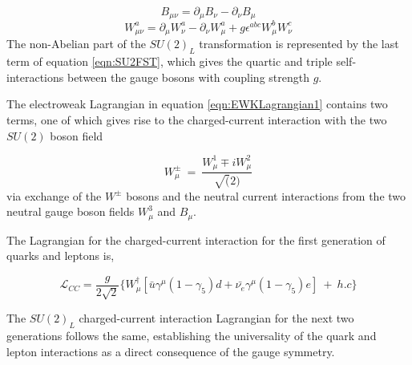 \begin{equation}
B_{\mu\nu} = \partial_{\mu}B_{\nu} - \partial_{\nu}B_{\mu}
\label{eqn:U1YFST}
\end{equation}
\begin{equation}
W_{\mu\nu}^{a} = \partial_{\mu}W_{\nu}^{a} - \partial_{\nu}W_{\mu}^{a} + g\epsilon^{abc}W_{\mu}^{b}W_{\nu}^{c}
\label{eqn:SU2FST}
\end{equation}
The non-Abelian part of the $SU(2)_{L}$ transformation is represented by the last term of equation \ref{eqn:SU2FST}, which gives the quartic and triple self-interactions between the gauge bosons with coupling strength $g$. 

The electroweak Lagrangian in equation \ref{eqn:EWKLagrangian1} contains two terms, one of which gives rise to the charged-current interaction with the two $SU(2)$ boson field 

\begin{equation}
W^{\pm}_{\mu} ~=~ \frac{ W^{1}_{\mu} \mp iW^{2}_{\mu} } {\sqrt(2)}
\label{eqn:RealWBosons}
\end{equation}
via exchange of the $W^{\pm}$ bosons and the neutral current interactions from the two neutral gauge boson fields $W^{3}_{\mu}$ and $B_{\mu}$. 

The Lagrangian for the charged-current interaction for the first generation of quarks and leptons is, 

\begin{equation}
\mathcal{L}_{CC} = \frac{g}{2\sqrt{2}} \{ W^{\dagger}_{\mu} [\bar{u}\gamma^{\mu}(1-\gamma_{5})d + \bar{\nu_{e}}\gamma^{\mu}(1-\gamma_{5})e ]~+~h.c \}
\label{eqn:SU2CCLag}
\end{equation}

The $SU(2)_{L}$ charged-current interaction Lagrangian for the next two generations follows the same, establishing the universality of the quark and lepton interactions as a direct consequence of the gauge symmetry.

